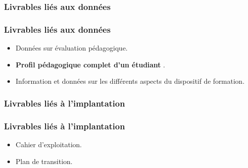 					\subsubsection{Livrables liés aux données} 
							\begin{frame}
							\frametitle{Livrables liés aux données}
                        			
							\begin{itemize}
							
							\item Données sur évaluation pédagogique.
							\item \textbf{Profil pédagogique complet d’un étudiant }.
							\item Information et données sur les différents aspects du dispositif de formation.
								
							\end{itemize}						
					\end{frame}
					
					\subsubsection{Livrables liés à l'implantation} 
							\begin{frame}
							\frametitle{Livrables liés à l'implantation}
                        			
							\begin{itemize}
							
							\item Cahier d’exploitation.
							\item Plan de transition.
								
							\end{itemize}						
					\end{frame}
					
					
